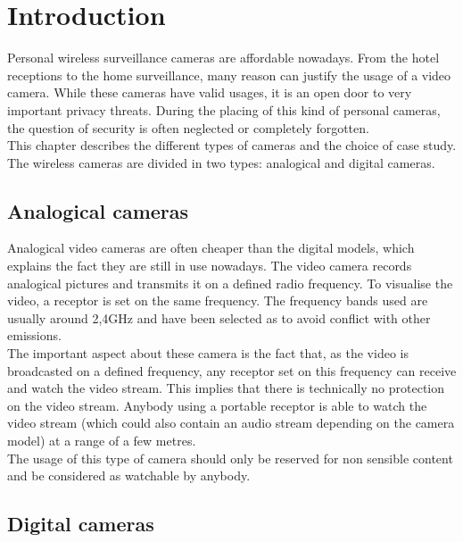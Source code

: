 
\chapter{Introduction}
\label{chap:wifi-cam}


Personal wireless surveillance cameras are affordable nowadays.
From the hotel receptions to the home surveillance, many reason can justify the usage of a video camera.
While these cameras have valid usages, it is an open door to very important privacy threats.
During the placing of this kind of personal cameras, the question of security is often neglected or completely forgotten.\\

This chapter describes the different types of cameras and the choice of case study.
The wireless cameras are divided in two types: analogical and digital cameras.

\section{Analogical cameras}
\label{sec:cam-analogic}

Analogical video cameras are often cheaper than the digital models, which explains the fact they are still in use nowadays.
The video camera records analogical pictures and transmits it on a defined radio frequency.
To visualise the video, a receptor is set on the same frequency.
The frequency bands used are usually around 2,4GHz and have been selected as to avoid conflict with other emissions.\\

The important aspect about these camera is the fact that, as the video is broadcasted on a defined frequency, any receptor set on this frequency can receive and watch the video stream.
This implies that there is technically no protection on the video stream.
Anybody using a portable receptor is able to watch the video stream (which could also contain an audio stream depending on the camera model) at a range of a few metres.\\

The usage of this type of camera should only be reserved for non sensible content and be considered as watchable by anybody.

\section{Digital cameras}
\label{sec:cam-digital}

